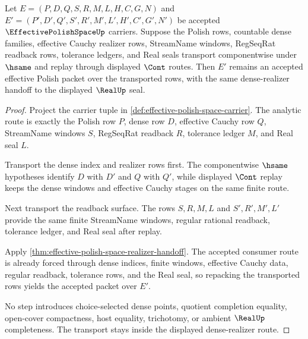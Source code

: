 \begin{theorem}
\label{thm:effective-polish-dense-realizer-transport}
Let $E=(P,D,Q,S,R,M,L,H,C,G,N)$ and $E'=(P',D',Q',S',R',M',L',H',C',G',N')$ be accepted $\EffectivePolishSpaceUp$ carriers. Suppose the Polish rows, countable dense families, effective Cauchy realizer rows, StreamName windows, RegSeqRat readback rows, tolerance ledgers, and Real seals transport componentwise under $\hsame$ and replay through displayed $\Cont$ routes. Then $E'$ remains an accepted effective Polish packet over the transported rows, with the same dense-realizer handoff to the displayed $\RealUp$ seal.
\end{theorem}
\begin{proof}
Project the carrier tuple in \autoref{def:effective-polish-space-carrier}. The analytic route is exactly the Polish row $P$, dense row $D$, effective Cauchy row $Q$, StreamName windows $S$, RegSeqRat readback $R$, tolerance ledger $M$, and Real seal $L$.

Transport the dense index and realizer rows first. The componentwise $\hsame$ hypotheses identify $D$ with $D'$ and $Q$ with $Q'$, while displayed $\Cont$ replay keeps the dense windows and effective Cauchy stages on the same finite route.

Next transport the readback surface. The rows $S,R,M,L$ and $S',R',M',L'$ provide the same finite StreamName windows, regular rational readback, tolerance ledger, and Real seal after replay.

Apply \autoref{thm:effective-polish-space-realizer-handoff}. The accepted consumer route is already forced through dense indices, finite windows, effective Cauchy data, regular readback, tolerance rows, and the Real seal, so repacking the transported rows yields the accepted packet over $E'$.

No step introduces choice-selected dense points, quotient completion equality, open-cover compactness, host equality, trichotomy, or ambient $\RealUp$ completeness. The transport stays inside the displayed dense-realizer route.
\end{proof}

